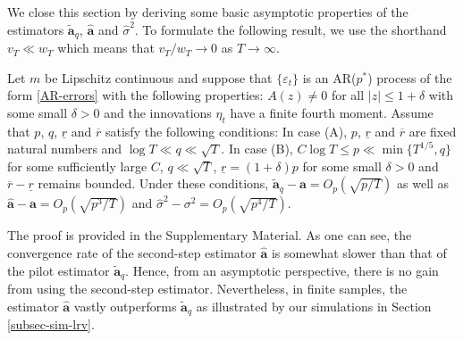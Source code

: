 We close this section by deriving some basic asymptotic properties of the estimators $\widetilde{\boldsymbol{a}}_q$, $\widehat{\boldsymbol{a}}$ and $\widehat{\sigma}^2$. To formulate the following result, we use the shorthand $v_T \ll w_T$ which means that $v_T/w_T \rightarrow 0$ as $T \rightarrow \infty$.  
\begin{prop}\label{prop-lrv}
Let $m$ be Lipschitz continuous and suppose that $\{\varepsilon_t\}$ is an AR($p^*$) process of the form \eqref{AR-errors} with the following properties: $A(z) \ne 0$ for all $|z| \le 1 + \delta$ with some small $\delta > 0$ and the innovations $\eta_t$ have a finite fourth moment. Assume that $p$, $q$, $\underline{r}$ and $\overline{r}$ satisfy the following conditions: In case (A), $p$, $\underline{r}$ and $\overline{r}$ are fixed natural numbers and $\log T \ll q \ll \sqrt{T}$. In case (B), $C \log T \le p \ll \min\{ T^{1/5},q\}$ for some sufficiently large $C$, $q \ll \sqrt{T}$, $\underline{r} = (1+\delta)p$ for some small $\delta > 0$ and $\overline{r} - \underline{r}$ remains bounded. Under these conditions, $\widetilde{\boldsymbol{a}}_q - \boldsymbol{a} = O_p(\sqrt{p/T})$ as well as $\widehat{\boldsymbol{a}} - \boldsymbol{a} = O_p(\sqrt{p^3/T})$ and $\widehat{\sigma}^2 - \sigma^2 = O_p(\sqrt{p^4/T})$.
\end{prop}
The proof is provided in the Supplementary Material. As one can see, the convergence rate of the second-step estimator $\widehat{\boldsymbol{a}}$ is somewhat slower than that of the pilot estimator $\widetilde{\boldsymbol{a}}_q$. Hence, from an asymptotic perspective, there is no gain from using the second-step estimator. Nevertheless, in finite samples, the estimator $\widehat{\boldsymbol{a}}$ vastly outperforms $\widetilde{\boldsymbol{a}}_q$ as illustrated by our simulations in Section \ref{subsec-sim-lrv}.


